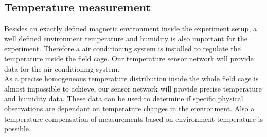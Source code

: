 \documentclass[a4paper]{scrreprt}
\begin{document}
\subsection{Temperature measurement}
Besides an exactly defined magnetic environment inside the experiment setup, a well defined
environment temperature and humidity is also important for the experiment. Therefore a
air conditioning system is installed to regulate the temperature inside the field cage.
Our temperature sensor network will provide data for the air conditioning system.\\
As a precise homogeneous temperature distribution inside the whole field cage is
almost impossible to achieve, our sensor network will provide precise temperature and humidity data. These data can be used to determine if specific physical observations are dependant
on temperature changes in the environment. Also a temperature compensation of measurements
based on environment temperature is possible.
\end{document}
